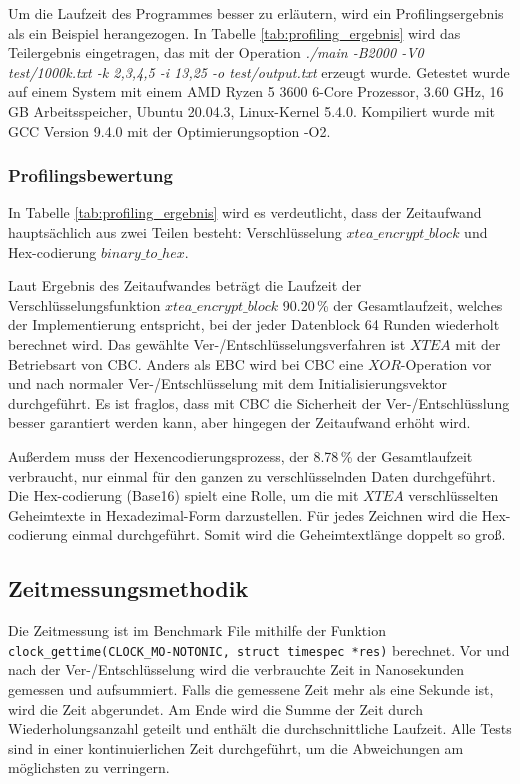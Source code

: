 \documentclass[course=erap]{aspdoc}
\begin{document}
Um die Laufzeit des Programmes besser zu erläutern, wird ein Profilingsergebnis als ein Beispiel herangezogen. In Tabelle \ref{tab:profiling_ergebnis} wird das Teilergebnis eingetragen, das mit der Operation \textit{./main -B2000 -V0 test/1000k.txt -k 2,3,4,5 -i 13,25 -o test/output.txt} erzeugt wurde. Getestet wurde auf einem System mit einem AMD Ryzen 5 3600 6-Core Prozessor, 3.60 GHz, 16 GB Arbeitsspeicher, Ubuntu 20.04.3, Linux-Kernel 5.4.0. Kompiliert wurde mit GCC Version 9.4.0 mit der Optimierungsoption -O2.

\subsubsection{Profilingsbewertung}
In Tabelle \ref{tab:profiling_ergebnis} wird es verdeutlicht, dass der Zeitaufwand hauptsächlich aus zwei Teilen besteht: Verschlüsselung $xtea\_encrypt\_block$ und Hex-codierung $binary\_to\_hex$.

Laut Ergebnis des Zeitaufwandes beträgt die Laufzeit der Verschlüsselungsfunktion $xtea\_encrypt\_block$ 90.20\,\% der Gesamtlaufzeit, welches der Implementierung entspricht, bei der jeder Datenblock 64 Runden wiederholt berechnet wird. Das gewählte Ver-/Entschlüsselungsverfahren ist $XTEA$ mit der Betriebsart von CBC. Anders als EBC wird bei CBC eine $XOR$-Operation vor und nach normaler Ver-/Entschlüsselung mit dem Initialisierungsvektor durchgeführt. Es ist fraglos, dass mit CBC die Sicherheit der Ver-/Entschlüsslung besser garantiert werden kann, aber hingegen der Zeitaufwand erhöht wird.

Außerdem muss der Hexencodierungsprozess, der 8.78\,\% der Gesamtlaufzeit verbraucht, nur einmal für den ganzen zu verschlüsselnden Daten durchgeführt. Die Hex-codierung (Base16) spielt eine Rolle, um die mit $XTEA$ verschlüsselten Geheimtexte in Hexadezimal-Form darzustellen. Für jedes Zeichnen wird die Hex-codierung einmal durchgeführt. Somit wird die Geheimtextlänge doppelt so groß.

\subsection{Zeitmessungsmethodik}
Die Zeitmessung ist im Benchmark File mithilfe der Funktion \lstinline{clock_gettime(CLOCK_MO-NOTONIC, struct timespec *res)} berechnet. Vor und nach der Ver-/Entschlüsselung wird die verbrauchte Zeit in Nanosekunden gemessen und aufsummiert. Falls die gemessene Zeit mehr als eine Sekunde ist, wird die Zeit abgerundet. Am Ende wird die Summe der Zeit durch Wiederholungsanzahl geteilt und enthält die durchschnittliche Laufzeit. Alle Tests sind in einer kontinuierlichen Zeit durchgeführt, um die Abweichungen am möglichsten zu verringern.
\end{document}
